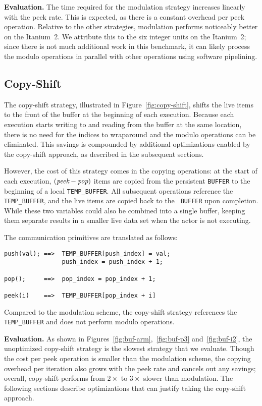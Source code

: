 {\bf Evaluation.}  The time required for the modulation strategy
increases linearly with the peek rate.  This is expected, as there is
a constant overhead per peek operation.  Relative to the other
strategies, modulation performs noticeably better on the Itanium~2.
We attribute this to the six integer units on the Itanium~2; since
there is not much additional work in this benchmark, it can likely
process the modulo operations in parallel with other operations using
software pipelining.

\subsection{Copy-Shift}

The copy-shift strategy, illustrated in Figure~\ref{fig:copy-shift},
shifts the live items to the front of the buffer at the beginning of
each execution.  Because each execution starts writing to and reading from
the buffer at the same location, there is no need for the indices to
wraparound and the modulo operations can be eliminated.  This savings
is compounded by additional optimizations enabled by the copy-shift
approach, as described in the subsequent sections.

However, the cost of this strategy comes in the copying operations: at
the start of each execution, $(\mbox{\it peek} - \mbox{\it pop})$
items are copied from the persistent {\tt BUFFER} to the beginning of
a local {\tt TEMP\_BUFFER}.  All subsequent operations reference the
{\tt TEMP\_BUFFER}, and the live items are copied back to the {\tt
BUFFER} upon completion.  While these two variables could also be
combined into a single buffer, keeping them separate results in a
smaller live data set when the actor is not executing.

The communication primitives are translated as follows:

{\scriptsize
\begin{verbatim}
push(val); ==>  TEMP_BUFFER[push_index] = val;
                push_index = push_index + 1;

pop();     ==>  pop_index = pop_index + 1;

peek(i)    ==>  TEMP_BUFFER[pop_index + i]
\end{verbatim}}
\noindent Compared to the modulation scheme, the copy-shift strategy
references the {\tt TEMP\_BUFFER} and does not perform modulo
operations.

{\bf Evaluation.}  As shown in
Figures~\ref{fig:buf-arm},~\ref{fig:buf-p3} and~\ref{fig:buf-i2},
the unoptimized copy-shift strategy is the slowest strategy that we
evaluate.  Though the cost per peek operation is smaller than the
modulation scheme, the copying overhead per iteration also grows with
the peek rate and cancels out any savings; overall, copy-shift
performs from $2\times$ to $3\times$ slower than modulation.  The following sections
describe optimizations that can justify taking the copy-shift
approach.

